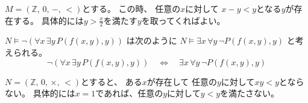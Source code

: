 \documentclass[12pt,b5paper]{ltjsarticle}
\begin{document}
\begin{enumerate}
\begin{enumerate}
             \dotfill

             $M = (\mathbb{Z}, \, 0, \, -, \, <)$とする。
             この時、
             任意の$x$に対して
             $x-y < y$となる$y$が存在する。
             具体的には$y>\frac{x}{2}$を満たす$y$を取ってくればよい。

             $N \vDash \neg \left(
                \forall x \, \exists y \, P\left( f\left(x,y\right), y \right)
              \right)$
             は次のように
             $N \vDash
             \exists x \, \forall y \,
             \neg P\left( f\left(x,y\right), y \right)$
             と考えられる。
             \begin{equation}
               \neg \left(
                \forall x \, \exists y \, P\left( f\left(x,y\right), y \right)
              \right)
               \quad \Leftrightarrow \quad
               \exists x \, \forall y \, \neg P\left( f\left(x,y\right), y \right)
             \end{equation}


             $N=(\mathbb{Z}, \, 0, \, \times, \, <)$とすると、
             ある$x$が存在して
             任意の$y$に対して$xy<y$とならない。
             具体的には$x=1$であれば、任意の$y$に対して$y<y$を満たさない。




             \hrulefill

       \end{enumerate}







%
%
%
%
%
%
%
%
%
%
%
%

\end{enumerate}

\hrulefill
\end{document}
